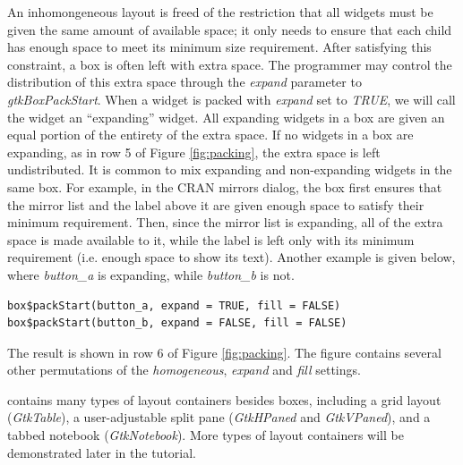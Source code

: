 \documentclass[article]{jss}
\begin{document}
An inhomongeneous layout is freed of the restriction that all widgets must be given the same amount of available space; it only needs to ensure that each child has enough space to meet its minimum size requirement. After satisfying this constraint, a box is often left with extra space. The programmer may control the distribution of this extra space through the \emph{expand} parameter to \emph{gtkBoxPackStart}.  When a widget is packed with \emph{expand} set to \emph{TRUE}, we will call the widget an ``expanding'' widget. All expanding widgets in a box are given an equal portion of the entirety of the extra space. If no widgets in a box are expanding, as in row 5 of Figure \ref{fig:packing}, the extra space is left undistributed. It is common to mix expanding and non-expanding widgets in the same box. For example, in the CRAN mirrors dialog, the box first ensures that the mirror list and the label above it are given enough space to satisfy their minimum requirement. Then, since the mirror list is expanding, all of the extra space is made available to it, while the label is left only with its minimum requirement (i.e. enough space to show its text).
Another example is given below, where \emph{button\_a} is expanding, while \emph{button_b} is not.
\begin{verbatim}
box$packStart(button_a, expand = TRUE, fill = FALSE)
box$packStart(button_b, expand = FALSE, fill = FALSE)
\end{verbatim}
The result is shown in row 6 of Figure \ref{fig:packing}. 
The figure contains several other permutations of the \emph{homogeneous}, \emph{expand} and \emph{fill} settings.

 contains many types of layout containers besides boxes,
including 
a grid layout (\emph{GtkTable}), a user-adjustable split pane
(\emph{GtkHPaned}
and \emph{GtkVPaned}), and a tabbed notebook (\emph{GtkNotebook}).
More types of
layout containers will be demonstrated later in the tutorial.


\end{document}
